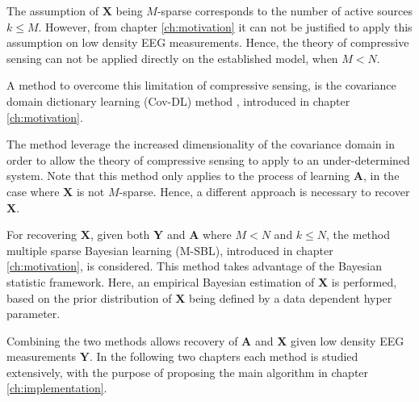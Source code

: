 The assumption of $\textbf{X}$ being $M$-sparse corresponds to the number of active sources $k\leq M$. However, from chapter \ref{ch:motivation} it can not be justified to apply this assumption on low density EEG measurements. Hence, the theory of compressive sensing can not be applied directly on the established model, when $M<N$.     

A method to overcome this limitation of compressive sensing, is the covariance domain dictionary learning (Cov-DL) method \cite{Balkan2015}, introduced in chapter \ref{ch:motivation}.

The method leverage the increased dimensionality of the covariance domain in order to allow the theory of compressive sensing to apply to an under-determined system. 
Note that this method only applies to the process of learning $\mathbf{A}$, in the case where $\textbf{X}$ is not $M$-sparse. 
Hence, a different approach is necessary to recover $\mathbf{X}$.

For recovering $\mathbf{X}$, given both $\mathbf{Y}$ and $\mathbf{A}$ where $M<N$ and $k\leq N$, the method multiple sparse Bayesian learning (M-SBL)\cite{Balkan2014}, introduced in chapter \ref{ch:motivation}, is considered.
This method takes advantage of the Bayesian statistic framework. Here, an empirical Bayesian estimation of $\textbf{X}$ is performed, based on the prior distribution of $\textbf{X}$ being defined by a data dependent hyper parameter.  

Combining the two methods allows recovery of $\mathbf{A}$ and $\mathbf{X}$ given low density EEG measurements $\mathbf{Y}$\cite{phd2015}. In the following two chapters each method is studied extensively, with the purpose of proposing the main algorithm in chapter \ref{ch:implementation}. 





